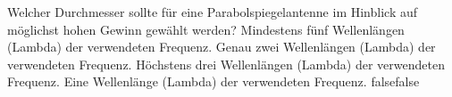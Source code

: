    {Welcher Durchmesser sollte für eine Parabolspiegelantenne im Hinblick auf möglichst hohen Gewinn gewählt werden?}
    {Mindestens fünf Wellenlängen (Lambda) der verwendeten Frequenz.}
    {Genau zwei Wellenlängen (Lambda) der verwendeten Frequenz.}
    {Höchstens drei Wellenlängen (Lambda) der verwendeten Frequenz.}
    {Eine Wellenlänge (Lambda) der verwendeten Frequenz.}
    {false}{false}